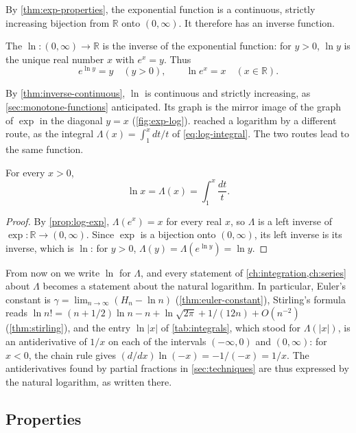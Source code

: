 By \cref{thm:exp-properties}, the exponential function is a continuous, strictly increasing bijection from $\mathbb R$ onto $(0,\infty)$. It therefore has an inverse function.

\begin{definition}
\label{def:ln}
The  $\ln\colon(0,\infty)\to\mathbb R$ is the inverse of the exponential function: for $y>0$, $\ln y$ is the unique real number $x$ with $e^x=y$. Thus
\[
e^{\ln y}=y\quad(y>0),\qquad\ln e^x=x\quad(x\in\mathbb R).
\]
\end{definition}

By \cref{thm:inverse-continuous}, $\ln$ is continuous and strictly increasing, as \cref{sec:monotone-functions} anticipated. Its graph is the mirror image of the graph of $\exp$ in the diagonal $y=x$ (\cref{fig:exp-log}).  reached a logarithm by a different route, as the integral $\Lambda(x)=\int_1^xdt/t$ of \eqref{eq:log-integral}. The two routes lead to the same function.

\begin{theorem}
\label{thm:ln-lambda}
For every $x>0$,
\[
\ln x=\Lambda(x)=\int_1^x\frac{dt}t .
\]
\end{theorem}

\begin{proof}
By \cref{prop:log-exp}, $\Lambda(e^x)=x$ for every real $x$, so $\Lambda$ is a left inverse of $\exp\colon\mathbb R\to(0,\infty)$. Since $\exp$ is a bijection onto $(0,\infty)$, its left inverse is its inverse, which is $\ln$: for $y>0$, $\Lambda(y)=\Lambda(e^{\ln y})=\ln y$.
\end{proof}

From now on we write $\ln$ for $\Lambda$, and every statement of \cref{ch:integration,ch:series} about $\Lambda$ becomes a statement about the natural logarithm. In particular, Euler's constant is $\gamma=\lim_{n\to\infty}(H_n-\ln n)$ (\cref{thm:euler-constant}), Stirling's formula reads $\ln n!=(n+1/2)\ln n-n+\ln\sqrt{2\pi}+1/(12n)+O(n^{-2})$ (\cref{thm:stirling}), and the entry $\ln|x|$ of \cref{tab:integrals}, which stood for $\Lambda(|x|)$, is an antiderivative of $1/x$ on each of the intervals $(-\infty,0)$ and $(0,\infty)$: for $x<0$, the chain rule gives $(d/dx)\ln(-x)=-1/(-x)=1/x$. The antiderivatives found by partial fractions in \cref{sec:techniques} are thus expressed by the natural logarithm, as written there.

\subsection{Properties}

